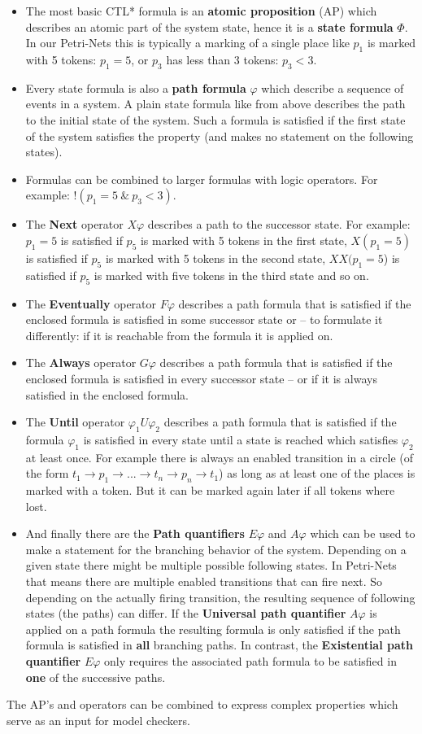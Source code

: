 \begin{itemize}
  \item The most basic CTL* formula is an \textbf{atomic proposition} (AP) which describes an atomic part of the system state, hence it is a \textbf{state formula} $\Phi$. 
  In our Petri-Nets this is typically a marking of a single place like $p_1$ is marked with 5 tokens: $p_1=5$, or $p_3$ has less than 3 tokens: $p_3<3$.
  \item Every state formula is also a \textbf{path formula} $\varphi$ which describe a sequence of events in a system.
  A plain state formula like from above describes the path to the initial state of the system. Such a formula is satisfied if the first state of the system satisfies the property (and makes no statement on the following states).
  \item Formulas can be combined to larger formulas with logic operators. For example: $!(p_1=5\ \&\ p_3<3)$.
  \item The \textbf{Next} operator $X\varphi$ describes a path to the successor state. For example: $p_1=5$ is satisfied if $p_5$ is marked with 5 tokens in the first state, $X(p_1=5)$ is satisfied if $p_5$ is marked with 5 tokens in the second state, $XX(p_1=5$) is satisfied if $p_5$ is marked with five tokens in the third state and so on.
  \item The \textbf{Eventually} operator $F\varphi$ describes a path formula that is satisfied if the enclosed formula is satisfied in some successor state or -- to formulate it differently: if it is reachable from the formula it is applied on.
  \item The \textbf{Always} operator $G\varphi$ describes a path formula that is satisfied if the enclosed formula is satisfied in every successor state -- or if it is always satisfied in the enclosed formula.
  \item The \textbf{Until} operator $\varphi_1 U\varphi_2$ describes a path formula that is satisfied if the formula $\varphi_1$ is satisfied in every state until a state is reached which satisfies $\varphi_2$ at least once.
  For example there is always an enabled transition in a circle (of the form $t_1\rightarrow p_1 \rightarrow ... \rightarrow t_n \rightarrow p_n \rightarrow t_1$) as long as at least one of the places is marked with a token.
  But it can be marked again later if all tokens where lost.
  \item And finally there are the \textbf{Path quantifiers} $E\varphi$ and $A\varphi$ which can be used to make a statement for the branching behavior of the system.
  Depending on a given state there might be multiple possible following states.
  In Petri-Nets that means there are multiple enabled transitions that can fire next.
  So depending on the actually firing transition, the resulting sequence of following states (the paths) can differ.
  If the \textbf{Universal path quantifier} $A\varphi$ is applied on a path formula the resulting formula is only satisfied if the path formula is satisfied in \textbf{all} branching paths.
  In contrast, the \textbf{Existential path quantifier} $E\varphi$ only requires the associated path formula to be satisfied in \textbf{one} of the successive paths.
\end{itemize}
The AP's and operators can be combined to express complex properties which serve as an input for model checkers.
